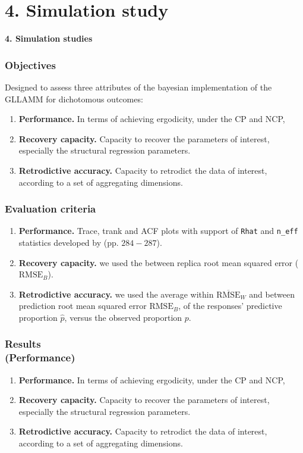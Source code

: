 \documentclass[arial,12pt,xcolor=dvipsnames]{beamer}
\begin{document}
\section{4. Simulation study}
%
\begin{frame}
	\textbf{4. Simulation studies}
\end{frame}
%
\begin{frame}
	\frametitle{Objectives}
	Designed to assess three attributes of the bayesian implementation of the GLLAMM for dichotomous outcomes:
	\begin{enumerate}
		\item \textbf{Performance.} In terms of achieving ergodicity, under the CP and NCP, 
		\item \textbf{Recovery capacity.} Capacity to recover the parameters of interest, especially the structural regression parameters.
		\item \textbf{Retrodictive accuracy.} Capacity to retrodict the data of interest, according to a set of aggregating dimensions.
	\end{enumerate} 
\end{frame}
%
\begin{frame}
	\frametitle{Evaluation criteria}
	\begin{enumerate}
		\item \textbf{Performance.} Trace, trank and ACF plots with support of \texttt{Rhat} and \texttt{n\_eff} statistics developed by \citet{Gelman_et_al_2014} (pp. $284-287$).
		\item \textbf{Recovery capacity.} we used the between replica root mean squared error ($\text{RMSE}_{B}$).
		\item \textbf{Retrodictive accuracy.} we used the average within $\overline{\text{RMSE}}_{W}$ and between prediction root mean squared error $\text{RMSE}_{B}$, of the responses' predictive proportion $\hat{p}$, versus the observed proportion $p$.
	\end{enumerate} 
\end{frame}
%
\begin{frame}
	\frametitle{Results \\
		(Performance)}
	\begin{enumerate}
		\item \textbf{Performance.} In terms of achieving ergodicity, under the CP and NCP, 
		\item \textbf{Recovery capacity.} Capacity to recover the parameters of interest, especially the structural regression parameters.
		\item \textbf{Retrodictive accuracy.} Capacity to retrodict the data of interest, according to a set of aggregating dimensions.
	\end{enumerate} 
\end{frame}
\end{document}
